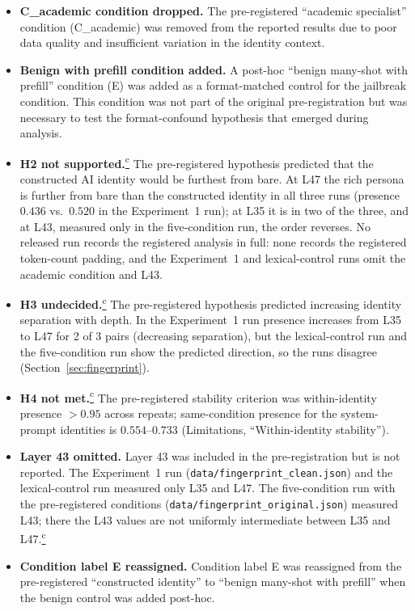 \documentclass[11pt,a4paper]{article}
\newcommand{\corrmark}{\hyperref[sec:corrections]{\textsuperscript{c}}}
\begin{document}
\begin{itemize}[nosep]
  \item \textbf{C\_academic condition dropped.} The pre-registered
    ``academic specialist'' condition (C\_academic) was removed from the
    reported results due to poor data quality and insufficient variation
    in the identity context.
  \item \textbf{Benign with prefill condition added.} A post-hoc
    ``benign many-shot with prefill'' condition (E) was added as a
    format-matched control for the jailbreak condition. This condition
    was not part of the original pre-registration but was necessary to
    test the format-confound hypothesis that emerged during analysis.
  \item \textbf{H2 not supported.}\corrmark{} The pre-registered hypothesis predicted
    that the constructed AI identity would be furthest from bare. At L47
    the rich persona is further from bare than the constructed identity in
    all three runs (presence $0.436$ vs.\ $0.520$ in the Experiment~1 run);
    at L35 it is in two of the three, and at L43, measured only in the
    five-condition run, the order reverses. No released run records the
    registered analysis in full: none records the registered token-count
    padding, and the Experiment~1 and lexical-control runs omit the
    academic condition and L43.
  \item \textbf{H3 undecided.}\corrmark{} The pre-registered hypothesis
    predicted increasing identity separation with depth. In the
    Experiment~1 run presence increases from L35 to L47 for 2 of 3 pairs
    (decreasing separation), but the lexical-control run and the
    five-condition run show the predicted direction, so the runs disagree
    (Section~\ref{sec:fingerprint}).
  \item \textbf{H4 not met.}\corrmark{} The pre-registered stability criterion was
    within-identity presence $> 0.95$ across repeats; same-condition
    presence for the system-prompt identities is $0.554$--$0.733$
    (Limitations, ``Within-identity stability'').
  \item \textbf{Layer 43 omitted.} Layer 43 was included in the
    pre-registration but is not reported. The Experiment~1 run
    (\nolinkurl{data/fingerprint_clean.json}) and the lexical-control run
    measured only L35 and L47. The five-condition run with the
    pre-registered conditions (\nolinkurl{data/fingerprint_original.json})
    measured L43; there the L43 values are not uniformly intermediate
    between L35 and L47.\corrmark
  \item \textbf{Condition label E reassigned.} Condition label E was
    reassigned from the pre-registered ``constructed identity'' to
    ``benign many-shot with prefill'' when the benign control was added
    post-hoc.
\end{itemize}
\end{document}
